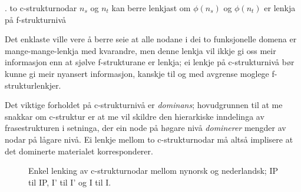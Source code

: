 \documentclass[12pt,a4paper,oneside,draft]{report}
\newcommand{\proj}[2]{\begin{tabular}{c}\footnotesize{#1}\\\normalsize{#2}\end{tabular}}
\newcommand{\ua}{\ensuremath{\uparrow}}
\newcommand{\da}{\ensuremath{\downarrow}}
\begin{document}
\ex.\label{krav:subnode-f-lenkja} to c\hyp{}strukturnodar $n_s$ og $n_t$ kan
     berre lenkjast om $\phi(n_s)$ og $\phi(n_t)$ er lenkja på
     f\hyp{}strukturnivå

Det enklaste ville vere å berre seie at alle nodane i dei to
 funksjonelle domena er mange-mange-lenkja med kvarandre, men denne
 lenkja vil ikkje gi oss meir informasjon enn at sjølve
 f\hyp{}strukturane er lenkja; ei lenkje på c\hyp{}strukturnivå bør
 kunne gi meir nyansert informasjon, kanskje til og med avgrense
 moglege f-strukturlenkjer.

Det viktige forholdet på c\hyp{}strukturnivå er \emph{dominans}; hovudgrunnen
til at me snakkar om c\hyp{}struktur er at me vil skildre den hierarkiske
inndelinga av frasestrukturen i setninga, der ein node på høgare nivå
\emph{dominerer} mengder av nodar på lågare nivå. Ei lenkje mellom to
c\hyp{}strukturnodar må altså implisere at det dominerte materialet
korresponderer.


\begin{figure}[htp]
\centering
   \caption{Enkel lenking av c\hyp{}strukturnodar mellom nynorsk og
   nederlandsk; IP til IP, I' til I' og I til I.}
   \label{fig:enkel-c-lenkje}
  \end{figure}
\end{document}
